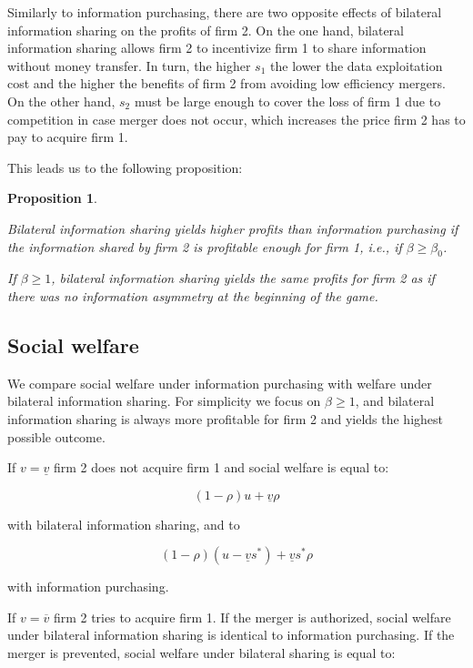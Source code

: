 \documentclass[a4paper,leqno]{article}%
\newtheorem{prop}{Proposition}
\newcommand{\uv}{\underline{v}}
\newcommand{\ov}{\overline{v}}
\begin{document}
\medskip

%
Similarly to information purchasing, there are two opposite effects of bilateral information sharing on the profits of firm 2. On the one hand, bilateral information sharing allows firm 2 to incentivize firm 1 to share information without money transfer. In turn, the higher $s_1$ the lower the data exploitation cost and the higher the benefits of firm 2 from avoiding low efficiency mergers. On the other hand, $s_2$ must be large enough to cover the loss of firm 1 due to competition in case merger does not occur, which increases the price firm 2 has to pay to acquire firm 1. 

\medskip

This leads us to the following proposition:

\begin{prop}~~

Bilateral information sharing yields higher profits than information purchasing if the information shared by firm 2 is profitable enough for firm 1, i.e., if $\beta\geq\beta_0$.

If $\beta\geq 1$, bilateral information sharing yields the same profits for firm 2 as if there was no information asymmetry at the beginning of the game.

\end{prop}

\medskip

\subsection{Social welfare}

\medskip

We compare social welfare under information purchasing with welfare under bilateral information sharing. For simplicity we focus on $\beta\geq1$, and bilateral information sharing is always more profitable for firm 2 and yields the highest possible outcome.

\medskip

If $v=\uv$ firm 2 does not acquire firm 1 and social welfare is equal to:

\[
(1-\rho) u+\uv \rho
\]

with bilateral information sharing, and to

\[
(1-\rho) (u-\uv s^*)+\uv s^*\rho
\]

with information purchasing.

\medskip

If $v=\ov$ firm 2 tries to acquire firm 1. If the merger is authorized, social welfare under bilateral information sharing is identical to information purchasing. If the merger is prevented, social welfare under bilateral sharing is equal to:
\end{document}
